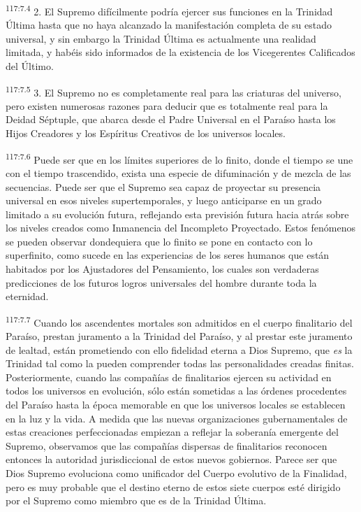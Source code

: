 \par
\textsuperscript{117:7.4} 2. El Supremo difícilmente podría ejercer sus funciones en la Trinidad Última hasta que no haya alcanzado la manifestación completa de su estado universal, y sin embargo la Trinidad Última es actualmente una realidad limitada, y habéis sido informados de la existencia de los Vicegerentes Calificados del Último.

\par
\textsuperscript{117:7.5} 3. El Supremo no es completamente real para las criaturas del universo, pero existen numerosas razones para deducir que es totalmente real para la Deidad Séptuple, que abarca desde el Padre Universal en el Paraíso hasta los Hijos Creadores y los Espíritus Creativos de los universos locales.

\par
\textsuperscript{117:7.6} Puede ser que en los límites superiores de lo finito, donde el tiempo se une con el tiempo trascendido, exista una especie de difuminación y de mezcla de las secuencias. Puede ser que el Supremo sea capaz de proyectar su presencia universal en esos niveles supertemporales, y luego anticiparse en un grado limitado a su evolución futura, reflejando esta previsión futura hacia atrás sobre los niveles creados como Inmanencia del Incompleto Proyectado. Estos fenómenos se pueden observar dondequiera que lo finito se pone en contacto con lo superfinito, como sucede en las experiencias de los seres humanos que están habitados por los Ajustadores del Pensamiento, los cuales son verdaderas predicciones de los futuros logros universales del hombre durante toda la eternidad.

\par
\textsuperscript{117:7.7} Cuando los ascendentes mortales son admitidos en el cuerpo finalitario del Paraíso, prestan juramento a la Trinidad del Paraíso, y al prestar este juramento de lealtad, están prometiendo con ello fidelidad eterna a Dios Supremo, que \textit{es} la Trinidad tal como la pueden comprender todas las personalidades creadas finitas. Posteriormente, cuando las compañías de finalitarios ejercen su actividad en todos los universos en evolución, sólo están sometidas a las órdenes procedentes del Paraíso hasta la época memorable en que los universos locales se establecen en la luz y la vida. A medida que las nuevas organizaciones gubernamentales de estas creaciones perfeccionadas empiezan a reflejar la soberanía emergente del Supremo, observamos que las compañías dispersas de finalitarios reconocen entonces la autoridad jurisdiccional de estos nuevos gobiernos. Parece ser que Dios Supremo evoluciona como unificador del Cuerpo evolutivo de la Finalidad, pero es muy probable que el destino eterno de estos siete cuerpos esté dirigido por el Supremo como miembro que es de la Trinidad Última.

